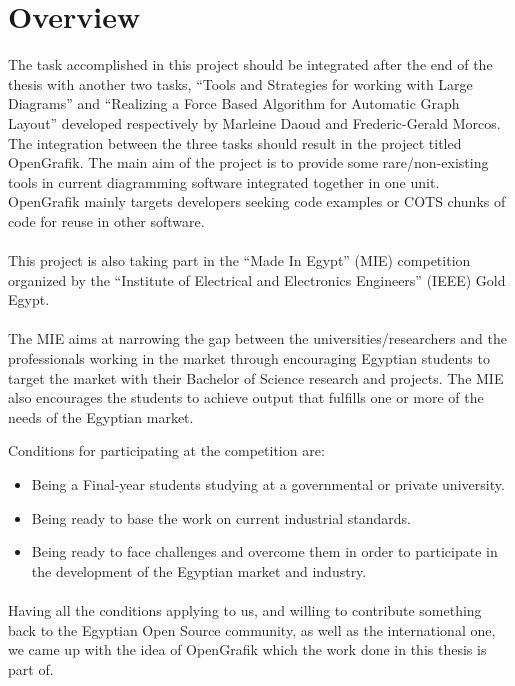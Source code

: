 \section{Overview}
The task accomplished in this project should be integrated after the end of the thesis with another two tasks, ``Tools and Strategies for working with Large Diagrams'' and ``Realizing a Force Based Algorithm for Automatic Graph Layout'' developed respectively by Marleine Daoud and Frederic-Gerald Morcos. The integration between the three tasks should result in the project titled OpenGrafik. The main aim of the project is to provide some rare/non-existing tools in current diagramming software integrated together in one unit. OpenGrafik mainly targets developers seeking code examples or COTS chunks of code for reuse in other software.

\paragraph{}
This project is also taking part in the ``Made In Egypt'' (MIE) competition organized by the ``Institute of Electrical and Electronics Engineers'' (IEEE) Gold Egypt. \cite{mie} \cite{ieee} \cite{ieeegoldegypt}

\paragraph{}
The MIE aims at narrowing the gap between the universities/researchers and the professionals working in the market through encouraging Egyptian students to target the market with their Bachelor of Science research and projects. The MIE also encourages the students to achieve output that fulfills one or more of the needs of the Egyptian market.

Conditions for participating at the competition are:
\begin{itemize}
\item Being a Final-year students studying at a governmental or private university.
\item Being ready to base the work on current industrial standards.
\item Being ready to face challenges and overcome them in order to participate in the development of the Egyptian market and industry.
\end{itemize}

\paragraph{}
Having all the conditions applying to us, and willing to contribute something back to the Egyptian Open Source community, as well as the international one, we came up with the idea of OpenGrafik which the work done in this thesis is part of.


